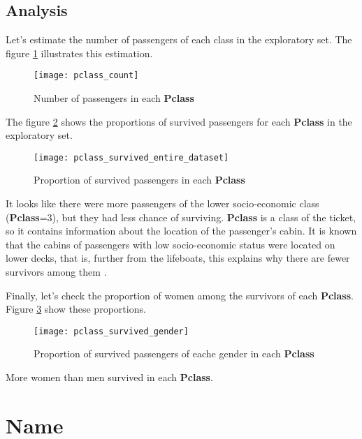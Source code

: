 \subsection{Analysis}
Let's estimate the number of passengers of each class in the exploratory
set. The figure \ref{pic:pclass_count} illustrates this estimation.

\begin{figure}[!ht]
    \centering
    \texttt{[image: pclass\_count]}
    \caption{Number of passengers in each \textbf{Pclass}}
    \label{pic:pclass_count}
\end{figure}

The figure \ref{pic:pclass_survived_entire_dataset} shows the proportions
of survived passengers for each \textbf{Pclass} in the exploratory set.

\begin{figure}[!ht]
    \centering
    \texttt{[image: pclass\_survived\_entire\_dataset]}
    \caption{Proportion of survived passengers in each \textbf{Pclass}}
    \label{pic:pclass_survived_entire_dataset}
\end{figure}

It looks like there were more passengers of the lower socio-economic class 
(\textbf{Pclass}=3), but they had less chance of surviving. \textbf{Pclass}
is a class of the ticket, so it contains information about the location 
of the passenger's cabin. It is known that the cabins of passengers with 
low socio-economic status were located on lower decks, that is, further 
from the lifeboats, this explains why there are fewer survivors among them
\cite{titanic-wikipedia}.

Finally, let's check the proportion of women among the survivors of each
\textbf{Pclass}. Figure \ref{pic:pclass_survived_gender} show these 
proportions.

\begin{figure}[!ht]
    \centering
    \texttt{[image: pclass\_survived\_gender]}
    \caption{Proportion of survived passengers of eache gender in each \textbf{Pclass}}
    \label{pic:pclass_survived_gender}
\end{figure}

More women than men survived in each \textbf{Pclass}.


\section{Name} \label{section:Name}

